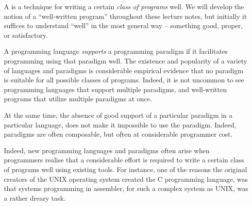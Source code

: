 A  is a technique for writing a certain \emph{class
of programs} well. We will develop the notion of a ``well-written program''
throughout these lecture notes, but initially it suffices to understand
``well'' in the most general way -- something good, proper, or satisfactory.

A programming language \emph{supports} a programming paradigm if it facilitates
programming using that paradigm well. The existence and popularity of a variety
of languages and paradigms is considerable empirical evidence that no paradigm
is suitable for all possible classes of programs. Indeed, it is not uncommon to
see programming languages that support multiple paradigms, and well-written
programs that utilize multiple paradigms at once.

At the same time, the absence of good support of a particular paradigm in a
particular language, does not make it impossible to use the paradigm. Indeed,
paradigms are often composable, but often at considerable programmer cost.

Indeed, new programming languages and paradigms often arise when programmers
realise that a considerable effort is required to write a certain class of
programs well using existing tools. For instance, one of the reasons the
original creators of the UNIX operating system created the C programming
language, was that systems programming in assembler, for such a complex system
as UNIX, was a rather dreary task\cite{the-development-of-c}.







